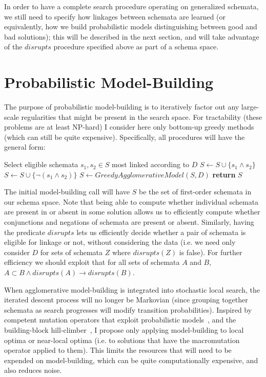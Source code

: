 \documentclass[letterpaper]{article}
\begin{document}
In order to have a complete search procedure operating on generalized schemata,
we still need to specify how linkages between schemata are learned (or
equivalently, how we build probabilistic models distinguishing between good and
bad solutions); this will be described in the next section, and will take
advantage of the $disrupts$ procedure specified above as part of a schema
space.

\section{Probabilistic Model-Building}

The purpose of probabilistic model-building is to iteratively factor out any
large-scale regularities that might be present in the search space. For
tractability (these problems are at least NP-hard) I consider here only
bottom-up greedy methods (which can still be quite expensive). Specifically,
all procedures will have the general form:

\begin{algorithmic}
  \State Select eligible schemata $s_1,s_2 \in S$ most linked according to $D$
    \State $S \leftarrow S \cup \{s_1 \wedge s_2\}$
  \EndIf
    \State $S \leftarrow S \cup \{\neg (s_1 \wedge s_2)\}$
  \EndIf
    \State $S \leftarrow GreedyAgglomerativeModel(S,D)$
  \EndIf
  \State \textbf{return} $S$
\EndProcedure
\end{algorithmic}

The initial model-building call will have $S$ be the set of first-order
schemata in our schema space. Note that being able to compute whether
individual schemata are present in or absent in some solution allows us to
efficiently compute whether conjunctions and negations of schemata are present
or absent. Similarly, having the predicate $disrupts$ lets us efficiently
decide whether a pair of schemata is eligible for linkage or not, without
considering the data (i.e. we need only consider $D$ for sets of schemata $Z$
where $disrupts(Z)$ is false). For further efficiency we should exploit that
for all sets of schemata $A$ and $B$, $A \subset B \wedge disrupts(A)
\rightarrow disrupts(B)$.

When agglomerative model-building is integrated into stochastic local search,
the iterated descent process will no longer be Markovian (since grouping
together schemata as search progresses will modify transition
probabilities). Inspired by competent mutation operators that exploit
probabilistic models~\cite{CompetentMutation,CompetentMutation2}, and the
building-block hill-climber~\cite{Iclanzan,Iclanzan2}, I propose only applying
model-building to local optima or near-local optima (i.e. to solutions that
have the macromutation operator applied to them). This limits the resources
that will need to be expended on model-building, which can be quite
computationally expensive, and also reduces noise.
\end{document}
